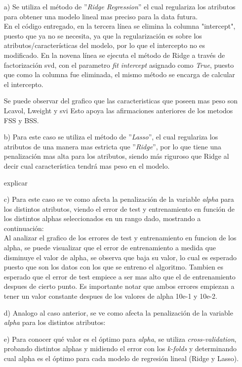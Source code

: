 \documentclass[10pt]{article}
\begin{document}
\begin{itemize}

\item[a)] Se utiliza el método de ''\textit{Ridge Regression}'' el cual regulariza los atributos para obtener una modelo lineal mas preciso para la data futura.\\
En el código entregado, en la tercera línea se elimina la columna "intercept", puesto que ya no se necesita, ya que la regularización es sobre los atributos/características del modelo, por lo que el intercepto no es modificado. En la novena línea se ejecuta el método de Ridge a través de factorización svd, con el parametro \textit{fit intercept} asignado como \textit{True}, puesto que como la columna fue eliminada, el mismo método se encarga de calcular el intercepto.

 Se puede observar del grafico que las caracteristicas que poseen mas peso son Lcavol, Lweight y svi
 Esto apoya las afirmaciones anteriores de los metodos FSS y BSS.

\item[b)] Para este caso se utiliza el método de ''\textit{Lasso}'', el cual regulariza los atributos de una manera mas estricta que ''\textit{Ridge}'', por lo que tiene una penalización mas alta para los atributos, siendo más riguroso que Ridge al decir cual característica tendrá mas peso en el modelo.

explicar
\item[c)] Para este caso se ve como afecta la penalización de la variable \textit{alpha} para los distintos atributos, viendo el error de test y entrenamiento en función de los distintos alphas seleccionados en un rango dado, mostrando a continuación:\\

 Al analizar el grafico de los errores de test y entrenamiento en funcion de los alpha, se puede
 visualizar que el error de entrenamiento a medida que disminuye el valor de alpha, se observa que
 baja su valor, lo cual es esperado puesto que son los datos con los que se entreno el algoritmo.
 Tambien es esperado que el error de test empiece a ser mas alto que el de entrenamiento despues
 de cierto punto. Es importante notar que ambos errores empiezan a tener un valor constante
 despues de los valores de alpha 10e-1 y 10e-2.

\item[d)] Analogo al caso anterior, se ve como afecta la penalización de la variable \textit{alpha} para los distintos atributos:\\


\item[e)] Para conocer qué valor es el óptimo para \textit{alpha}, se utiliza \textit{cross-validation}, probando distintos alphas y midiendo el error con los \textit{k-folds} y determinando cual alpha es el óptimo para cada modelo de regresión lineal (Ridge y Lasso).

\end{itemize}
\end{document}
